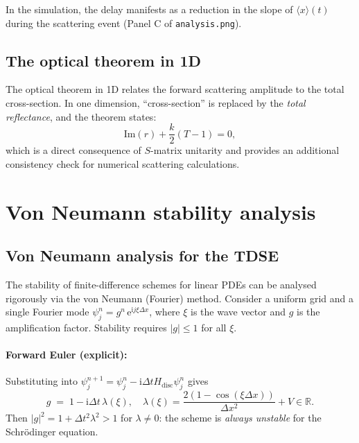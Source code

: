 \documentclass[12pt, a4paper]{article}
\newcommand{\dt}{\Delta t}
\newcommand{\dx}{\Delta x}
\newcommand{\ii}{\mathrm{i}}          %
\newcommand{\ee}{\mathrm{e}}          %
\begin{document}
In the simulation, the delay manifests as a reduction in the slope
of $\langle x\rangle(t)$ during the scattering event (Panel C of
\texttt{analysis.png}).

\subsection{The optical theorem in 1D}

The optical theorem in 1D relates the forward scattering amplitude to
the total cross-section.  In one dimension, ``cross-section'' is
replaced by the \emph{total reflectance}, and the theorem states:
\begin{equation}
  \mathrm{Im}(r) + \frac{k}{2}(T-1) = 0,
\end{equation}
which is a direct consequence of $S$-matrix unitarity and
provides an additional consistency check for numerical scattering
calculations.

\section{Von Neumann stability analysis}
\label{app:stability}

\subsection{Von Neumann analysis for the TDSE}

The stability of finite-difference schemes for linear PDEs can be
analysed rigorously via the von Neumann (Fourier) method.  Consider a
uniform grid and a single Fourier mode $\psi_j^n = g^n\,\ee^{\ii j\xi\dx}$,
where $\xi$ is the wave vector and $g$ is the amplification factor.
Stability requires $|g| \leq 1$ for all $\xi$.

\paragraph{Forward Euler (explicit):}
Substituting into $\psi_j^{n+1} = \psi_j^n - \ii\dt H_\text{disc}\psi_j^n$
gives
\begin{equation}
  g \;=\; 1 - \ii\dt\,\lambda(\xi),
  \quad \lambda(\xi) = \frac{2(1-\cos(\xi\dx))}{\dx^2} + V \in \mathbb{R}.
\end{equation}
Then $|g|^2 = 1 + \dt^2\lambda^2 > 1$ for $\lambda \neq 0$: the scheme
is \emph{always unstable} for the Schrödinger equation.
\end{document}
